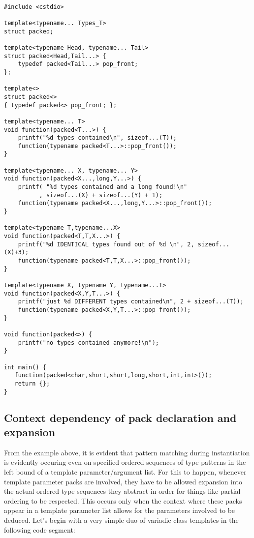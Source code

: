 \documentclass[ notitlepage
              , a4paper
              , twoside ]{article}
\newcommand{\parnum}{\bfseries\arabic{parcount}}
\newcounter{parcount}
\newcommand\p{%
    \stepcounter{parcount}%
    \leavevmode\marginpar[\hfill\parnum]{\parnum}%
}
\begin{document}
\begin{verbatim}

#include <cstdio>

template<typename... Types_T>
struct packed;

template<typename Head, typename... Tail>
struct packed<Head,Tail...> {
    typedef packed<Tail...> pop_front;
};

template<>
struct packed<>
{ typedef packed<> pop_front; };

template<typename... T>
void function(packed<T...>) {
    printf("%d types contained\n", sizeof...(T));
    function(typename packed<T...>::pop_front());
}

template<typename... X, typename... Y>
void function(packed<X...,long,Y...>) {
    printf( "%d types contained and a long found!\n"
          , sizeof...(X) + sizeof...(Y) + 1);
    function(typename packed<X...,long,Y...>::pop_front());
}

template<typename T,typename...X>
void function(packed<T,T,X...>) {
    printf("%d IDENTICAL types found out of %d \n", 2, sizeof...(X)+3);
    function(typename packed<T,T,X...>::pop_front());
}

template<typename X, typename Y, typename...T>
void function(packed<X,Y,T...>) {
    printf("just %d DIFFERENT types contained\n", 2 + sizeof...(T));
    function(typename packed<X,Y,T...>::pop_front());
}

void function(packed<>) {
    printf("no types contained anymore!\n");
}

int main() {
   function(packed<char,short,short,long,short,int,int>());
   return {};
}

\end{verbatim}

\subsection{Context dependency of pack declaration and expansion}

\p From the example above, it is evident that pattern matching during
instantiation is evidently occuring even on specified
ordered sequences of type patterns in the left bound of a template parameter/argument
list. For this to happen, whenever template
parameter packs are involved, they have to be allowed expansion into the actual
ordered type sequences they abstract in order for things like partial
ordering to be respected. This occurs only when the context where
these packs appear in a template parameter list allows for the parameters
involved to be deduced. Let's begin with a very simple duo of variadic class
templates in the following code segment:
\end{document}

